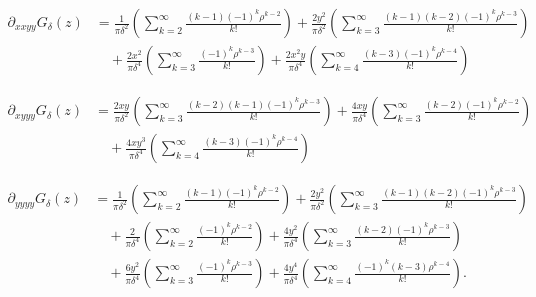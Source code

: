 \documentclass[12pt]{amsart}
\begin{document}
\begin{align*}
	\partial_{xxyy} G_\delta(z) &= \frac{1}{\pi \delta^2} \left( \sum_{k=2}^\infty \frac{ (k-1) (-1)^k \rho^{k-2} }{ k!} \right) 
	+ \frac{2y^2}{\pi \delta^2} \left( \sum_{k=3}^\infty \frac{ (k-1)(k-2) (-1)^k \rho^{k-3} }{ k!} \right) \\
	&\quad + \frac{2x^2}{\pi \delta^4} \left( \sum_{k=3}^\infty \frac{  (-1)^k \rho^{k-3} }{ k!} \right)
	+ \frac{2x^2y}{\pi \delta^4} \left( \sum_{k=4}^\infty \frac{  (k-3) (-1)^k \rho^{k-4} }{ k!} \right)
\end{align*}

\begin{align*}
	\partial_{xyyy} G_\delta(z) &= \frac{2xy}{\pi \delta^2} \left( \sum_{k=3}^\infty \frac{ (k-2)(k-1) (-1)^k \rho^{k-3} }{ k!} \right) 
		+ \frac{4xy}{\pi \delta^4} \left( \sum_{k=3}^\infty \frac{  (k-2)(-1)^k \rho^{k-2} }{ k!} \right)\\
		&\quad + \frac{4 x y^3}{\pi \delta^4} \left( \sum_{k=4}^\infty \frac{  (k-3)(-1)^k \rho^{k-4} }{ k!} \right)
\end{align*}

\begin{align*}
	\partial_{yyyy} G_\delta(z) &= \frac{1}{\pi \delta^2} \left( \sum_{k=2}^\infty \frac{ (k-1) (-1)^k \rho^{k-2} }{ k!} \right) 
	+  \frac{2y^2}{\pi \delta^2} \left( \sum_{k=3}^\infty \frac{ (k-1) (k-2) (-1)^k \rho^{k-3} }{ k!} \right) \\
	&\quad + \frac{2}{\pi \delta^4} \left( \sum_{k=2}^\infty \frac{  (-1)^k \rho^{k-2} }{ k!} \right)
	+ \frac{4y^2}{\pi \delta^4} \left( \sum_{k=3}^\infty \frac{  (k-2)(-1)^k \rho^{k-3} }{ k!} \right)\\
	&\quad + \frac{6y^2}{\pi \delta^4} \left( \sum_{k=3}^\infty \frac{  (-1)^k \rho^{k-3} }{ k!} \right)
	+ \frac{4y^4}{\pi \delta^4} \left( \sum_{k=4}^\infty \frac{  (-1)^k (k-3) \rho^{k-4} }{ k!} \right).
\end{align*}
\end{document}
